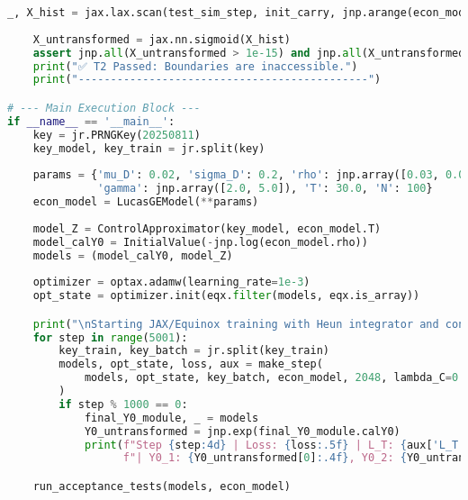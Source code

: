 \begin{lstlisting}[language=Python, caption={C.5: Training Loop, JIT-compiled Step, and Acceptance Tests.}, label={lst:jax_training_app_appendix}]
    _, X_hist = jax.lax.scan(test_sim_step, init_carry, jnp.arange(econ_model.N))
    
    X_untransformed = jax.nn.sigmoid(X_hist)
    assert jnp.all(X_untransformed > 1e-15) and jnp.all(X_untransformed < 1.0 - 1e-15), "T2 Failed: Boundary hit!"
    print("✅ T2 Passed: Boundaries are inaccessible.")
    print("---------------------------------------------")

# --- Main Execution Block ---
if __name__ == '__main__':
    key = jr.PRNGKey(20250811)
    key_model, key_train = jr.split(key)
    
    params = {'mu_D': 0.02, 'sigma_D': 0.2, 'rho': jnp.array([0.03, 0.04]), 
              'gamma': jnp.array([2.0, 5.0]), 'T': 30.0, 'N': 100}
    econ_model = LucasGEModel(**params)
    
    model_Z = ControlApproximator(key_model, econ_model.T)
    model_calY0 = InitialValue(-jnp.log(econ_model.rho))
    models = (model_calY0, model_Z)
    
    optimizer = optax.adamw(learning_rate=1e-3)
    opt_state = optimizer.init(eqx.filter(models, eqx.is_array))

    print("\nStarting JAX/Equinox training with Heun integrator and consistency loss...")
    for step in range(5001):
        key_train, key_batch = jr.split(key_train)
        models, opt_state, loss, aux = make_step(
            models, opt_state, key_batch, econ_model, 2048, lambda_C=0.5, optimizer=optimizer
        )
        if step % 1000 == 0:
            final_Y0_module, _ = models
            Y0_untransformed = jnp.exp(final_Y0_module.calY0)
            print(f"Step {step:4d} | Loss: {loss:.5f} | L_T: {aux['L_T']:.5f} | L_C: {aux['L_C']:.5f} "
                  f"| Y0_1: {Y0_untransformed[0]:.4f}, Y0_2: {Y0_untransformed[1]:.4f}")

    run_acceptance_tests(models, econ_model)
\end{lstlisting}

